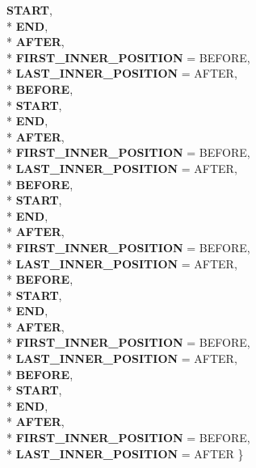 \begin{DoxyCompactItemize}
{\bfseries S\+T\+A\+RT}, 
\\*
{\bfseries E\+ND}, 
\\*
{\bfseries A\+F\+T\+ER}, 
\\*
{\bfseries F\+I\+R\+S\+T\+\_\+\+I\+N\+N\+E\+R\+\_\+\+P\+O\+S\+I\+T\+I\+ON} = B\+E\+F\+O\+RE, 
\\*
{\bfseries L\+A\+S\+T\+\_\+\+I\+N\+N\+E\+R\+\_\+\+P\+O\+S\+I\+T\+I\+ON} = A\+F\+T\+ER, 
\\*
{\bfseries B\+E\+F\+O\+RE}, 
\\*
{\bfseries S\+T\+A\+RT}, 
\\*
{\bfseries E\+ND}, 
\\*
{\bfseries A\+F\+T\+ER}, 
\\*
{\bfseries F\+I\+R\+S\+T\+\_\+\+I\+N\+N\+E\+R\+\_\+\+P\+O\+S\+I\+T\+I\+ON} = B\+E\+F\+O\+RE, 
\\*
{\bfseries L\+A\+S\+T\+\_\+\+I\+N\+N\+E\+R\+\_\+\+P\+O\+S\+I\+T\+I\+ON} = A\+F\+T\+ER, 
\\*
{\bfseries B\+E\+F\+O\+RE}, 
\\*
{\bfseries S\+T\+A\+RT}, 
\\*
{\bfseries E\+ND}, 
\\*
{\bfseries A\+F\+T\+ER}, 
\\*
{\bfseries F\+I\+R\+S\+T\+\_\+\+I\+N\+N\+E\+R\+\_\+\+P\+O\+S\+I\+T\+I\+ON} = B\+E\+F\+O\+RE, 
\\*
{\bfseries L\+A\+S\+T\+\_\+\+I\+N\+N\+E\+R\+\_\+\+P\+O\+S\+I\+T\+I\+ON} = A\+F\+T\+ER, 
\\*
{\bfseries B\+E\+F\+O\+RE}, 
\\*
{\bfseries S\+T\+A\+RT}, 
\\*
{\bfseries E\+ND}, 
\\*
{\bfseries A\+F\+T\+ER}, 
\\*
{\bfseries F\+I\+R\+S\+T\+\_\+\+I\+N\+N\+E\+R\+\_\+\+P\+O\+S\+I\+T\+I\+ON} = B\+E\+F\+O\+RE, 
\\*
{\bfseries L\+A\+S\+T\+\_\+\+I\+N\+N\+E\+R\+\_\+\+P\+O\+S\+I\+T\+I\+ON} = A\+F\+T\+ER, 
\\*
{\bfseries B\+E\+F\+O\+RE}, 
\\*
{\bfseries S\+T\+A\+RT}, 
\\*
{\bfseries E\+ND}, 
\\*
{\bfseries A\+F\+T\+ER}, 
\\*
{\bfseries F\+I\+R\+S\+T\+\_\+\+I\+N\+N\+E\+R\+\_\+\+P\+O\+S\+I\+T\+I\+ON} = B\+E\+F\+O\+RE, 
\\*
{\bfseries L\+A\+S\+T\+\_\+\+I\+N\+N\+E\+R\+\_\+\+P\+O\+S\+I\+T\+I\+ON} = A\+F\+T\+ER
 \}\hypertarget{classv8_1_1internal_1_1_l_gap_ac4743ec140d442da0a1d34d826eaa9eb}{}\label{classv8_1_1internal_1_1_l_gap_ac4743ec140d442da0a1d34d826eaa9eb}


\end{DoxyCompactItemize}
